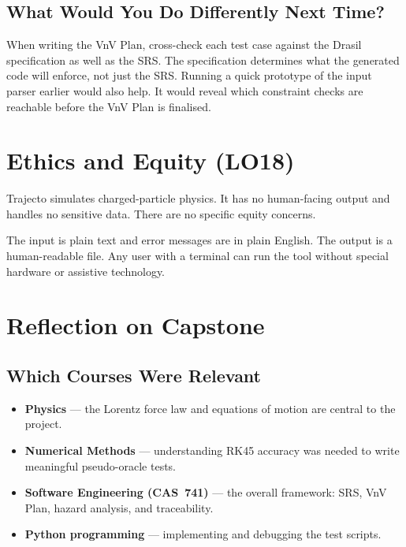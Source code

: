 \documentclass{article}
\begin{document}
\subsection{What Would You Do Differently Next Time?}

When writing the VnV Plan, cross-check each test case against the
Drasil specification as well as the SRS.
The specification determines what the generated code will enforce, not
just the SRS.
Running a quick prototype of the input parser earlier would also help.
It would reveal which constraint checks are reachable before the VnV
Plan is finalised.

\section{Ethics and Equity (LO18)}

Trajecto simulates charged-particle physics.
It has no human-facing output and handles no sensitive data.
There are no specific equity concerns.

The input is plain text and error messages are in plain English.
The output is a human-readable file.
Any user with a terminal can run the tool without special
hardware or assistive technology.

\section{Reflection on Capstone}

\subsection{Which Courses Were Relevant}

\begin{itemize}
  \item \textbf{Physics} ---
        the Lorentz force law and equations of motion are central to
        the project.
  \item \textbf{Numerical Methods} ---
        understanding RK45 accuracy was needed to write meaningful
        pseudo-oracle tests.
  \item \textbf{Software Engineering (CAS~741)} ---
        the overall framework: SRS, VnV Plan, hazard analysis, and
        traceability.
  \item \textbf{Python programming} ---
        implementing and debugging the test scripts.
\end{itemize}
\end{document}
